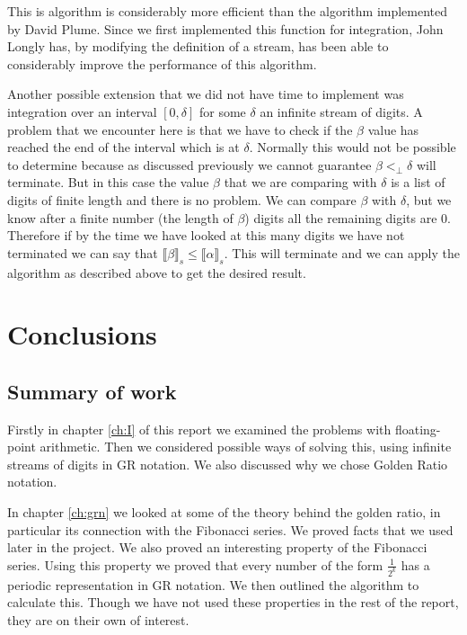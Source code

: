 \documentclass{cs4rep}
\begin{document}
This is algorithm is considerably more efficient than the algorithm
implemented by David Plume. Since we first implemented this function
for integration, John Longly has, by modifying the definition of a
stream, has been able to considerably improve the performance of this
algorithm.



Another possible extension that we did not have time to implement was
integration over an interval $[0,\delta]$ for some $\delta$ an
infinite stream of digits.  A problem that we encounter here is that
we have to check if the $\beta$ value has reached the end of the
interval which is at $\delta$.  Normally this would not be possible to
determine because as discussed previously we cannot guarantee $\beta
<_{\perp} \delta$ will terminate. But in this case the value $\beta$
that we are comparing with $\delta$ is a list of digits of finite
length and there is no problem.  We can compare $\beta$ with $\delta$,
but we know after a finite number (the length of $\beta$) digits all
the remaining digits are 0. Therefore if by the time we have looked at
this many digits we have not terminated we can say that $ \llbracket
\beta \rrbracket_{s} \leq \llbracket \alpha \rrbracket_{s} $. This
will terminate and we can apply the algorithm as described above to
get the desired result.


\chapter{Conclusions} \label{ch:conc}

\section{Summary of work}
Firstly in chapter \ref{ch:I} of this report we examined the problems
with floating-point arithmetic. Then we considered possible ways of
solving this, using infinite streams of digits in GR notation. We also
discussed why we chose Golden Ratio notation.

In chapter \ref{ch:grn} we looked at some of the theory behind the
golden ratio, in particular its connection with the Fibonacci series.
We proved facts that we used later in the project. We also proved an
interesting property of the Fibonacci series. Using this property we
proved that every number of the form $\frac{1}{2^{k}}$ has a periodic
representation in GR notation. We then outlined the algorithm to
calculate this. Though we have not used these properties in the rest
of the report, they are on their own of interest.
\end{document}
